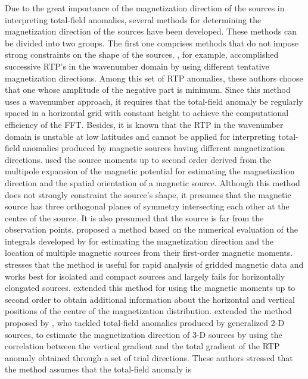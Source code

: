 \documentclass[journal abbreviation, npg]{copernicus}
\begin{document}
Due to the great importance of the magnetization direction of the 
sources in interpreting total-field anomalies, several methods for 
determining the magnetization direction of
the sources have been developed. These methods can be divided into two
groups. The first one comprises methods that do not impose strong constraints
on the shape of the sources. \citet{fedi-etal1994}, for example, accomplished
successive RTP's in the wavenumber domain by using different tentative
magnetization directions. Among this set of RTP anomalies, these authors
choose that one whose amplitude of the negative part is minimum. Since this
method uses a wavenumber approach, it requires that the total-field anomaly
be regularly spaced in a horizontal grid with constant height to achieve the
computational efficiency of the FFT. Besides, it is known that the RTP in the
wavenumber domain is unstable at low latitudes and cannot be applied for
interpreting total-field anomalies produced by magnetic sources having
different magnetization directions. \citet{medeiros-silva1995} used the
source moments up to second order derived from the multipole expansion of the
magnetic potential for estimating the magnetization direction and the spatial
orientation of a magnetic source. Although this method does not strongly
constraint the source's shape, it presumes that the magnetic source has three
orthogonal planes of symmetry intersecting each other at the centre of the
source. It is also presumed that the source is far from the observation
points. \citet{phillips2005} proposed a method based on the numerical
evaluation of the integrals developed by \citet{helbig1963} for estimating
the magnetization direction and the location of multiple magnetic sources
from their first-order magnetic moments. \citet{phillips2005} stresses 
that the method
is useful for rapid analysis of gridded magnetic data and works best for
isolated and compact sources and largely fails for horizontally elongated
sources. \citet{tontini-pedersen2008} extended this method for using the
magnetic moments up to second order to obtain additional information about
the horizontal and vertical positions of the centre of the magnetization
distribution. \citet{dannemiller-li2006} extended the method proposed by
\citet{roest-pilkington1993}, who tackled total-field anomalies produced by
generalized 2-D sources, to estimate the magnetization direction of 3-D
sources by using the correlation between the vertical gradient and the total
gradient of the RTP anomaly obtained through a set of trial directions. These
authors stressed that the method assumes that the total-field anomaly is
\end{document}
